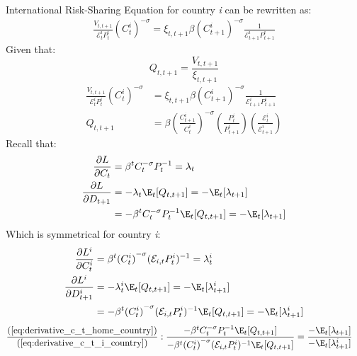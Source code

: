 International Risk-Sharing Equation for country \textit{i} can be rewritten as:
\begin{align}
    \frac{V_{t,t+1}}{\mathcal{E}^i_tP^i_t}({C^{i}_{t}})^{-\sigma} = \xi_{t,t+1} \beta ({C^{i}_{t+1}})^{-\sigma} \frac{1}{\mathcal{E}^i_{t+1}P^{i}_{t+1}}
\end{align}
Given that:
\begin{equation}
    Q_{t,t+1} = \frac{V_{t,t+1}}{\xi_{t,t+1}}
\end{equation}
\begin{align}
    \frac{V_{t,t+1}}{\mathcal{E}^i_tP^i_t}({C^{i}_{t}})^{-\sigma}         & = \xi_{t,t+1} \beta ({C^{i}_{t+1}})^{-\sigma} \frac{1}{\mathcal{E}^i_{t+1}P^{i}_{t+1}}                                                                    \\
    Q_{t,t+1}                                                             & = \beta \left(\frac{C^i_{t+1}}{C^i_{t}}\right)^{-\sigma} \left(\frac{P^i_t}{P^i_{t+1}}\right) \left(\frac{\mathcal{E}^i_{t}}{\mathcal{E}^i_{t+1}} \right) 
\end{align}
Recall that:
\begin{align}
    \frac{\partial L}{\partial C_t} &= \beta^t C_t^{-\sigma} P_{t}^{-1} = \lambda_t \nonumber\\
    \frac{\partial L}{\partial D_{t+1}} & = -\lambda_t \E_t[Q_{t,t+1}] = -\E_t[\lambda_{t+1}] \nonumber\\
    &=-\beta^t C_t^{-\sigma} P_{t}^{-1} \E_t[Q_{t,t+1}] = -\E_t[\lambda_{t+1}] \label{eq:derivative_c_t_home_country}
\end{align}
Which is symmetrical for country \textit{i}:
\begin{align}
    \frac{\partial L^i}{\partial C_t^i} &= \beta^t {(C^i_t)}^{-\sigma} (\mathcal{E}_{i,t}P^i_{t})^{-1} = \lambda^i_t \nonumber\\
    \frac{\partial L^i}{\partial D_{t+1}^i} & = -\lambda^i_t \E_t[Q_{t,t+1}] = -\E_t[\lambda^i_{t+1}] \nonumber\\
    &=-\beta^t {(C^i_t)}^{-\sigma} (\mathcal{E}_{i,t}P^i_{t})^{-1} \E_t[Q_{t,t+1}] = -\E_t[\lambda^i_{t+1}] \label{eq:derivative_c_t_i_country}
\end{align}
\begin{align*}
    \frac{\text{(\ref{eq:derivative_c_t_home_country})}}{\text{(\ref{eq:derivative_c_t_i_country})}}: \frac{-\beta^t C_t^{-\sigma} P_{t}^{-1} \E_t[Q_{t,t+1}]}{-\beta^t {(C^i_t)}^{-\sigma} (\mathcal{E}_{i,t}P^i_{t})^{-1} \E_t[Q_{t,t+1}]} &= \frac{-\E_t[\lambda_{t+1}]}{-\E_t[\lambda^i_{t+1}]}
\end{align*} 
